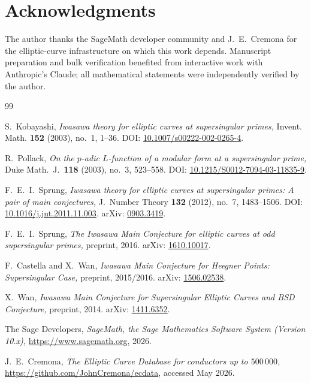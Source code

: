 \documentclass[11pt,a4paper]{amsart}
\theoremstyle{definition}
\begin{document}
\section*{Acknowledgments}

The author thanks the SageMath developer community and J.~E.~Cremona for the elliptic-curve infrastructure on which this work depends. Manuscript preparation and bulk verification benefited from interactive work with Anthropic's Claude; all mathematical statements were independently verified by the author.

\begin{thebibliography}{99}

S.~Kobayashi,
\emph{Iwasawa theory for elliptic curves at supersingular primes,}
Invent. Math. \textbf{152} (2003), no.~1, 1--36.
DOI: \href{https://doi.org/10.1007/s00222-002-0265-4}{10.1007/s00222-002-0265-4}.

R.~Pollack,
\emph{On the $p$-adic $L$-function of a modular form at a supersingular prime,}
Duke Math.\ J.\ \textbf{118} (2003), no.~3, 523--558.
DOI: \href{https://doi.org/10.1215/S0012-7094-03-11835-9}{10.1215/S0012-7094-03-11835-9}.

F.~E.~I.~Sprung,
\emph{Iwasawa theory for elliptic curves at supersingular primes: A pair of main conjectures,}
J.\ Number Theory \textbf{132} (2012), no.~7, 1483--1506.
DOI: \href{https://doi.org/10.1016/j.jnt.2011.11.003}{10.1016/j.jnt.2011.11.003}.
arXiv: \href{https://arxiv.org/abs/0903.3419}{0903.3419}.

F.~E.~I.~Sprung,
\emph{The Iwasawa Main Conjecture for elliptic curves at odd supersingular primes,}
preprint, 2016.
arXiv: \href{https://arxiv.org/abs/1610.10017}{1610.10017}.

F.~Castella and X.~Wan,
\emph{Iwasawa Main Conjecture for Heegner Points: Supersingular Case,}
preprint, 2015/2016.
arXiv: \href{https://arxiv.org/abs/1506.02538}{1506.02538}.

X.~Wan,
\emph{Iwasawa Main Conjecture for Supersingular Elliptic Curves and BSD Conjecture,}
preprint, 2014.
arXiv: \href{https://arxiv.org/abs/1411.6352}{1411.6352}.

The Sage Developers,
\emph{SageMath, the Sage Mathematics Software System (Version 10.x),}
\url{https://www.sagemath.org}, 2026.

J.~E.~Cremona,
\emph{The Elliptic Curve Database for conductors up to $500\,000$,}
\url{https://github.com/JohnCremona/ecdata}, accessed May 2026.

\end{thebibliography}
\end{document}
